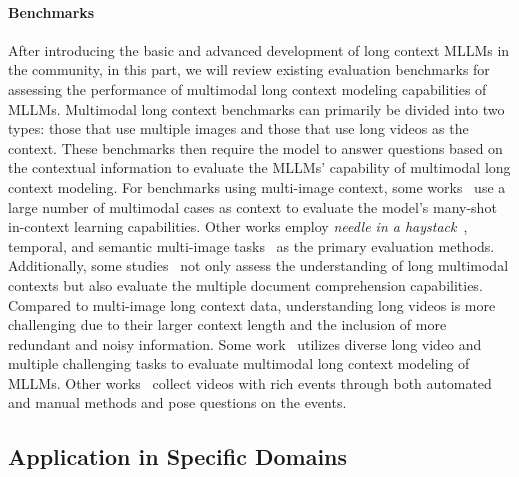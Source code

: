 \documentclass[11pt, a4paper, logo, copyright, nonumbering]{map}
\begin{document}
\paragraph{Benchmarks} After introducing the basic and advanced development of long context MLLMs in the community, in this part, we will review existing evaluation benchmarks for assessing the performance of multimodal long context modeling capabilities of MLLMs. Multimodal long context benchmarks can primarily be divided into two types: those that use multiple images and those that use long videos as the context. These benchmarks then require the model to answer questions based on the contextual information to evaluate the MLLMs' capability of multimodal long context modeling.  For benchmarks using multi-image context, some works~\citep{ma-2024-arxiv-mmlongbenchdoc,pramanick-2024-arxiv-spiqa, chia-2024-arxiv-mlongdoc} use a large number of multimodal cases as context to evaluate the model’s many-shot in-context learning capabilities. Other works employ \emph{needle in a haystack}~\citep{wang-2024-arxiv-MMNeedle}, temporal, and semantic multi-image tasks~\citep{song-2024-arxiv-milebench} as the primary evaluation methods. Additionally, some studies~\cite{jiang-2024-arxiv-manyshots,Sharma-2024-arxiv-LOCOVQA,Ruoss-2024-arxiv-lmact} not only assess the understanding of long multimodal contexts but also evaluate the multiple document comprehension capabilities. Compared to multi-image long context data, understanding long videos is more challenging due to their larger context length and the inclusion of more redundant and noisy information. Some work~\citep{zhou-2024-arxiv-mlvu,zou-2025-arxiv-hlv1k,Chandrasegaran-2024-arxiv-videohour,gang-2024-arxiv-longvale} utilizes diverse long video and multiple challenging tasks to evaluate multimodal long context modeling of MLLMs. Other works~\citep{Nagrani-2024-arxiv-Neptune,DBLP:journals/corr/abs-2406-14129,wu-2024-arxiv-longvideobench} collect videos with rich events through both automated and manual methods and pose questions on the events.



\subsection{Application in Specific Domains}
\end{document}
